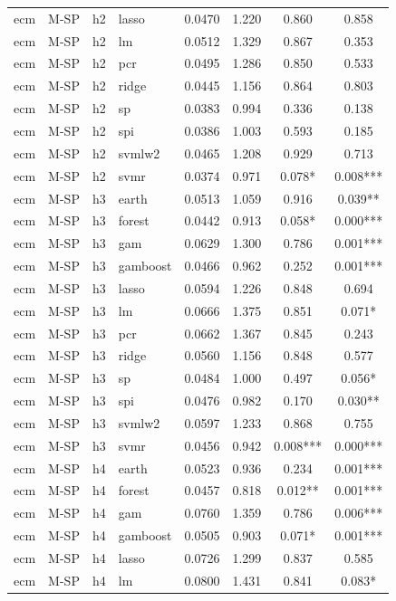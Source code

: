 \begin{ThreePartTable}
\begin{longtable}[t]{llclcccc}
ecm & M-SP & h2 & lasso & 0.0470 & 1.220 & 0.860 & 0.858\\
ecm & M-SP & h2 & lm & 0.0512 & 1.329 & 0.867 & 0.353\\
ecm & M-SP & h2 & pcr & 0.0495 & 1.286 & 0.850 & 0.533\\
ecm & M-SP & h2 & ridge & 0.0445 & 1.156 & 0.864 & 0.803\\
ecm & M-SP & h2 & sp & 0.0383 & 0.994 & 0.336 & 0.138\\
ecm & M-SP & h2 & spi & 0.0386 & 1.003 & 0.593 & 0.185\\
ecm & M-SP & h2 & svmlw2 & 0.0465 & 1.208 & 0.929 & 0.713\\
ecm & M-SP & h2 & svmr & 0.0374 & 0.971 & 0.078* & 0.008***\\
\addlinespace
ecm & M-SP & h3 & earth & 0.0513 & 1.059 & 0.916 & 0.039**\\
ecm & M-SP & h3 & forest & 0.0442 & 0.913 & 0.058* & 0.000***\\
ecm & M-SP & h3 & gam & 0.0629 & 1.300 & 0.786 & 0.001***\\
ecm & M-SP & h3 & gamboost & 0.0466 & 0.962 & 0.252 & 0.001***\\
ecm & M-SP & h3 & lasso & 0.0594 & 1.226 & 0.848 & 0.694\\
ecm & M-SP & h3 & lm & 0.0666 & 1.375 & 0.851 & 0.071*\\
ecm & M-SP & h3 & pcr & 0.0662 & 1.367 & 0.845 & 0.243\\
ecm & M-SP & h3 & ridge & 0.0560 & 1.156 & 0.848 & 0.577\\
ecm & M-SP & h3 & sp & 0.0484 & 1.000 & 0.497 & 0.056*\\
ecm & M-SP & h3 & spi & 0.0476 & 0.982 & 0.170 & 0.030**\\
ecm & M-SP & h3 & svmlw2 & 0.0597 & 1.233 & 0.868 & 0.755\\
ecm & M-SP & h3 & svmr & 0.0456 & 0.942 & 0.008*** & 0.000***\\
\addlinespace
ecm & M-SP & h4 & earth & 0.0523 & 0.936 & 0.234 & 0.001***\\
ecm & M-SP & h4 & forest & 0.0457 & 0.818 & 0.012** & 0.001***\\
ecm & M-SP & h4 & gam & 0.0760 & 1.359 & 0.786 & 0.006***\\
ecm & M-SP & h4 & gamboost & 0.0505 & 0.903 & 0.071* & 0.001***\\
ecm & M-SP & h4 & lasso & 0.0726 & 1.299 & 0.837 & 0.585\\
ecm & M-SP & h4 & lm & 0.0800 & 1.431 & 0.841 & 0.083*\\

\end{longtable}
\end{ThreePartTable}
